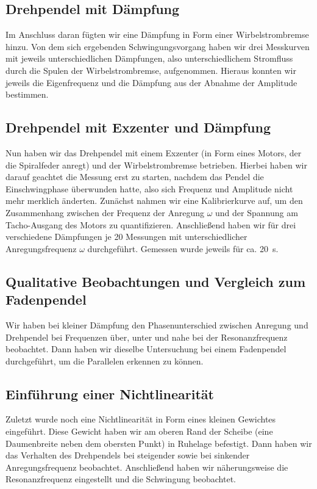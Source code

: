 \documentclass[
	a4paper,
	12pt,
	pagesize,
	ngerman
]{scrartcl}
\begin{document}
	\subsection{Drehpendel mit Dämpfung}
	Im Anschluss daran fügten wir eine Dämpfung in Form einer Wirbelstrombremse hinzu. Von dem sich ergebenden Schwingungsvorgang haben wir drei Messkurven mit jeweils unterschiedlichen Dämpfungen, also unterschiedlichem Stromfluss durch die Spulen der Wirbelstrombremse, aufgenommen. Hieraus konnten wir jeweils die Eigenfrequenz und die Dämpfung aus der Abnahme der Amplitude bestimmen. %
	\subsection{Drehpendel mit Exzenter und Dämpfung} 
	Nun haben wir das Drehpendel mit einem Exzenter (in Form eines Motors, der die Spiralfeder anregt) und der Wirbelstrombremse betrieben. Hierbei haben wir darauf geachtet die Messung erst zu starten, nachdem das Pendel die Einschwingphase überwunden hatte, also sich Frequenz und Amplitude nicht mehr merklich änderten.
	Zunächst nahmen wir eine Kalibrierkurve auf, um den Zusammenhang zwischen der Frequenz der Anregung $\omega$ und der Spannung am Tacho-Ausgang des Motors zu quantifizieren.
	Anschließend haben wir für drei verschiedene Dämpfungen je 20 Messungen mit unterschiedlicher Anregungsfrequenz $\omega$ durchgeführt. Gemessen wurde jeweils für ca. \SI{20}{\second}. 
	\subsection{Qualitative Beobachtungen und Vergleich zum Fadenpendel}
	Wir haben bei kleiner Dämpfung den Phasenunterschied zwischen Anregung und Drehpendel bei Frequenzen über, unter und nahe bei der Resonanzfrequenz beobachtet. Dann haben wir dieselbe Untersuchung bei einem Fadenpendel durchgeführt, um die Parallelen erkennen zu können.
	\subsection{Einführung einer Nichtlinearität}
	Zuletzt wurde noch eine Nichtlinearität in Form eines kleinen Gewichtes eingeführt. Diese Gewicht haben wir am oberen Rand der Scheibe (eine Daumenbreite neben dem obersten Punkt) in Ruhelage befestigt. Dann haben wir das Verhalten des Drehpendels bei steigender sowie bei sinkender Anregungsfrequenz beobachtet. Anschließend haben wir näherungsweise die Resonanzfrequenz eingestellt und die Schwingung beobachtet.
	
\end{document}
